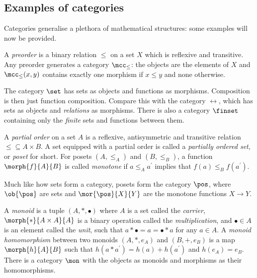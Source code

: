 \subsection{Examples of categories}

Categories generalise a plethora of mathematical structures: some examples will
now be provided.

\begin{example}[Preorder]
    A \emph{preorder} is a binary relation \(\leq\) on a set \(X\) which is
    reflexive and transitive.
    Any preorder generates a category \(\mcc_\leq\): the objects are the
    elements of \(X\) and \(\mcc_\leq(x, y)\) contains exactly one morphism if
    \(x \leq y\) and none otherwise.
\end{example}

\begin{example}[Sets]
    The category \(\set\) has sets as objects and functions as morphisms.
    Composition is then just function composition.
    Compare this with the category \(\rel\), which has sets as objects and
    \emph{relations} as morphisms.
    There is also a category \(\finset\) containing only the \emph{finite} sets
    and functions between them.
\end{example}

\begin{example}[Posets]
    A \emph{partial order} on a set \(A\) is a reflexive, antisymmetric and
    transitive relation \({\leq} \subseteq A \times B\).
    A set equipped with a partial order is called a
    \emph{partially ordered set}, or \emph{poset} for short.
    For posets \((A,{\leq_A})\) and \((B,{\leq_B})\), a function
    \(\morph{f}{A}{B}\) is called \emph{monotone} if \(a \leq_A a^\prime\)
    implies that \(f(a) \leq_B f(a^\prime)\).

    Much like how sets form a category, posets form the category \(\pos\), where
    \(\ob{\pos}\) are sets and \(\mor{\pos}{X}{Y}\) are the monotone functions
    \(X \to Y\).
\end{example}

\begin{example}[Monoids]
    A \emph{monoid} is a tuple \((A, *, \bullet)\) where \(A\) is a set called
    the \emph{carrier}, \(\morph{*}{A \times A}{A}\) is a binary operation
    called the \emph{multiplication}, and \(\bullet \in A\) is an element called
    the \emph{unit}, such that \(a * \bullet = a = \bullet * a\) for any
    \(a \in A\).
    A \emph{monoid homomorphism} between two monoids \((A, *, e_A)\) and
    \((B, +, e_B)\) is a map \(\morph{h}{A}{B}\) such that
    \(h(a * a^\prime) = h(a) + h(a^\prime)\) and \(h(e_A) = e_B\).
    There is a category \(\mon\) with the objects as monoids and morphisms as
    their homomorphisms.
\end{example}

